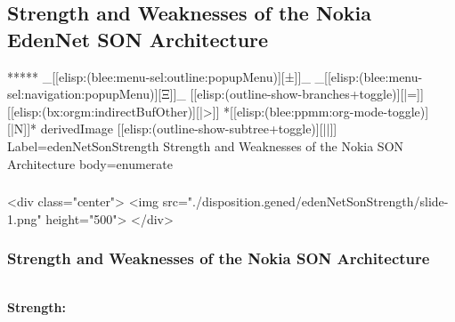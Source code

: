 \begin{whenOrg}
\section{Strength and Weaknesses of the Nokia EdenNet SON Architecture}


\begin{whenOrg}
*****  _[[elisp:(blee:menu-sel:outline:popupMenu)][±]]_ _[[elisp:(blee:menu-sel:navigation:popupMenu)][Ξ]]_ [[elisp:(outline-show-branches+toggle)][|=]] [[elisp:(bx:orgm:indirectBufOther)][|>]] *[[elisp:(blee:ppmm:org-mode-toggle)][|N]]*  derivedImage [[elisp:(outline-show-subtree+toggle)][||]] Label=edenNetSonStrength Strength and Weaknesses of the Nokia SON Architecture body=enumerate
\end{whenOrg}

\begin{htmlonly}

\begin{frame}[fragile,plain,label=edenNetSonStrength]
    \frametitle{}
    \framesubtitle{}
    \begin{rawhtml}
<div class="center">
<img src="./disposition.gened/edenNetSonStrength/slide-1.png" height="500">
</div>
    \end{rawhtml}
\end{frame}
\end{htmlonly}

\begin{verblatex}

\begin{frame}[fragile,plain,label=edenNetSonStrength]
    \frametitle{Strength and Weaknesses of the Nokia SON Architecture}
    \framesubtitle{}

\begin{small}
\begin{columns}[T]

\begin{center}
        \colorbox{blue!30}{\color{black} \textbf{Strength:}}
\end{center}


\end{columns}
\end{small}
\end{frame}
\end{verblatex}
\end{whenOrg}
